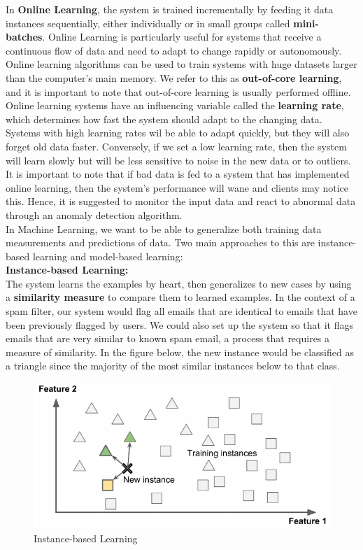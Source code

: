     \noindent In \textbf{Online Learning}, the system is trained incrementally by feeding it data instances
    sequentially, either individually or in small groups called \textbf{mini-batches}. Online Learning is
    particularly useful for systems that receive a continuous flow of data and need to adapt to change
    rapidly or autonomously. Online learning algorithms can be used to train systems with huge datasets
    larger than the computer's main memory. We refer to this as \textbf{out-of-core learning}, and it is
    important to note that out-of-core learning is usually performed offline. Online learning systems have an
    influencing variable called the \textbf{learning rate}, which determines how fast the system should adapt
    to the changing data. Systems with high learning rates wil be able to adapt quickly, but they will also
    forget old data faster. Conversely, if we set a low learning rate, then the system will learn slowly but
    will be less sensitive to noise in the new data or to outliers. It is important to note that if bad data
    is fed to a system that has implemented online learning, then the system's performance will wane and
    clients may notice this. Hence, it is suggested to monitor the input data and react to abnormal data
    through an anomaly detection algorithm. \\

    \noindent In Machine Learning, we want to be able to generalize both training data measurements and
    predictions of data. Two main approaches to this are instance-based learning and model-based learning: \\

    \noindent \textbf{Instance-based Learning:} \\
    The system learns the examples by heart, then generalizes to new cases by using a
    \textbf{similarity measure} to compare them to learned examples. In the context of a spam filter, our
    system would flag all emails that are identical to emails that have been previously flagged by users. We
    could also set up the system so that it flags emails that are very similar to known spam email, a process
    that requires a measure of similarity. In the figure below, the new instance would be classified as a
    triangle since the majority of the most similar instances below to that class.

    \begin{figure}[hbt!]
        \centering
        \includegraphics[scale=0.5]{Resources/Instance_based_learning}
        \caption*{Instance-based Learning}
    \end{figure}

